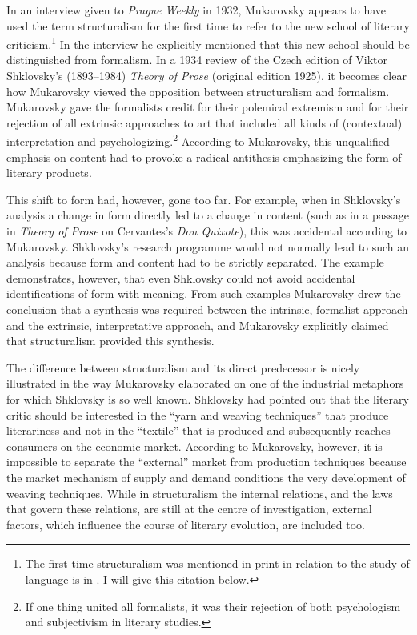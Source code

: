 \documentclass[output=paper]{langscibook}
\begin{document}
In an interview given to \emph{Prague Weekly} in 1932, Mukarovsky appears to have used the term structuralism for the first time to refer to the new school of literary criticism.\footnote{The first time structuralism was mentioned in print in relation to the study of language is in \citet{Jakobson1929}. I will give this citation below.} In the interview he explicitly mentioned that this new school should be distinguished from formalism. In a 1934 review of the Czech edition of Viktor Shklovsky's (1893--1984) \emph{Theory of Prose} (original edition 1925), it becomes clear how Mukarovsky viewed the opposition between structuralism and formalism. Mukarovsky gave the formalists credit for their polemical extremism and for their rejection of all extrinsic approaches to art that included all kinds of (contextual) interpretation and psychologizing.\footnote{If one thing united all formalists, it was their rejection of both psychologism and subjectivism in literary studies.} According to Mukarovsky, this unqualified emphasis on content had to provoke a radical antithesis emphasizing the form of literary products. 

This shift to form had, however, gone too far. For example, when in Shklovsky's analysis a change in form directly led to a change in content (such as in a passage in \emph{Theory of Prose} on Cervantes’s \emph{Don Quixote}), this was accidental according to Mukarovsky. Shklovsky's research programme would not normally lead to such an analysis because form and content had to be strictly separated. The example demonstrates, however, that even Shklovsky could not avoid accidental identifications of form with meaning. From such examples Mukarovsky drew the conclusion that a synthesis was required between the intrinsic, formalist approach and the extrinsic, interpretative approach, and Mukarovsky explicitly claimed that structuralism provided this synthesis. 

The difference between structuralism and its direct predecessor is nicely illustrated in the way Mukarovsky elaborated on one of the industrial metaphors for which Shklovsky is so well known. Shklovsky had pointed out that the literary critic should be interested in the ``yarn and weaving techniques'' that produce literariness and not in the ``textile'' that is produced and subsequently reaches consumers on the economic market.  According to Mukarovsky, however, it is impossible to separate the ``external'' market from production techniques because the market mechanism of supply and demand conditions the very development of weaving techniques. While in structuralism the internal relations, and the laws that govern these relations, are still at the centre of investigation, external factors, which influence the course of literary evolution, are included too. 
\end{document}
